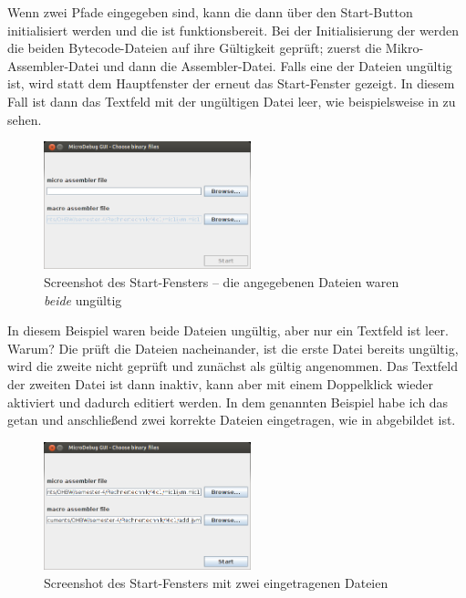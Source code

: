 Wenn zwei Pfade eingegeben sind, kann die \mic dann über den Start-Button initialisiert werden und die \mdg ist funktionsbereit. Bei der Initialisierung der \mic werden die beiden Bytecode-Dateien auf ihre Gültigkeit geprüft; zuerst die Mikro-Assembler-Datei und dann die Assembler-Datei. Falls eine der Dateien ungültig ist, wird statt dem Hauptfenster der \mdg erneut das Start-Fenster gezeigt. In diesem Fall ist dann das Textfeld mit der ungültigen Datei leer, wie beispielsweise in  zu sehen.

\begin{figure}[h]
	\centering
	\includegraphics[width=6cm]{images/start-frame-both-wrong}
	\caption{Screenshot des Start-Fensters -- die angegebenen Dateien waren \emph{beide} ungültig}
\end{figure}

In diesem Beispiel waren beide Dateien ungültig, aber nur ein Textfeld ist leer. Warum? Die \mdg prüft die Dateien nacheinander, ist die erste Datei bereits ungültig, wird die zweite nicht geprüft und zunächst als gültig angenommen. Das Textfeld der zweiten Datei ist dann inaktiv, kann aber mit einem Doppelklick wieder aktiviert und dadurch editiert werden. In dem genannten Beispiel habe ich das getan und anschließend zwei korrekte Dateien eingetragen, wie in  abgebildet ist.

\begin{figure}[h]
	\centering
	\includegraphics[width=6cm]{images/start-frame-both-filled}
	\caption{Screenshot des Start-Fensters mit zwei eingetragenen Dateien}
\end{figure}

